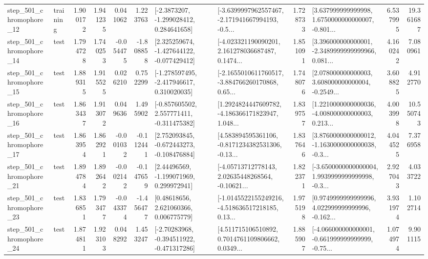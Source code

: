 \begin{tabular}{llrrrrllrlrr}
  step\_501\_chromophore\_12 &  training &      1.900172 &    1.941235 &      0.041062 &  1.223763 &     [-2.3873207, -1.299028412, 0.284641658] &  [-3.6399997962557467, -2.171941667994193, -0.5... &       1.728733 &  [3.637999999999998, 1.6750000000000007, -0.801... &            6.537995 &         19.361687 \\
  step\_501\_chromophore\_14 &      test &      1.794728 &    1.740253 &     -0.054475 & -1.808858 &   [2.325259674, -1.427644122, -0.077429412] &  [-4.023321190090201, 2.161278036687487, 0.1474... &       1.851091 &  [3.396000000000001, -2.3489999999999966, 0.081... &            4.160242 &          7.080961 \\
  step\_501\_chromophore\_15 &      test &      1.889315 &    1.915525 &      0.026210 &  0.752299 &   [-1.278597495, -2.417946617, 0.310020035] &  [-2.1655010611760517, -3.884766260170868, 0.65... &       1.748076 &  [2.078000000000003, 3.608000000000004, -0.2549... &            3.608825 &          4.912770 \\
  step\_501\_chromophore\_16 &      test &      1.863437 &    1.913072 &      0.049636 &  1.495902 &   [-0.857605502, 2.557771411, -0.311475382] &  [1.2924824447609782, -4.186366171823947, 1.048... &       1.839757 &  [1.2210000000000036, -4.008000000000003, 0.213... &            4.003998 &         10.550743 \\
  step\_501\_chromophore\_17 &      test &      1.863954 &    1.862921 &     -0.001032 & -0.112441 &   [2.752093845, -0.672443273, -0.108476884] &  [4.583894595361106, -0.8171234382531306, -0.13... &       1.837646 &  [3.8760000000000012, -1.1630000000000038, -0.3... &            4.044525 &          7.376958 \\
  step\_501\_chromophore\_21 &      test &      1.894784 &    1.892642 &     -0.002142 & -0.147659 &     [2.44496569, -1.199071969, 0.299972941] &  [-4.05713712778143, 2.02635448268564, -0.10621... &       1.822371 &  [-3.6500000000000004, 1.9939999999999998, -0.3... &            2.927043 &          4.033722 \\
  step\_501\_chromophore\_23 &      test &      1.836851 &    1.793477 &     -0.043374 & -1.456477 &      [0.48618656, 2.621060366, 0.006775779] &  [-1.0145522155249216, -4.518636517218185, 0.13... &       1.975198 &  [0.9749999999999996, 4.022999999999996, -0.162... &            3.931974 &          1.102714 \\
  step\_501\_chromophore\_24 &      test &      1.874811 &    1.923103 &      0.048292 &  1.453247 &   [-2.70283968, -0.394511922, -0.471317286] &  [4.511715106510892, 0.7014761109806662, 0.0349... &       1.885907 &  [-4.066000000000001, -0.661999999999999, -0.75... &            1.074974 &          9.901115 \\

\end{tabular}
